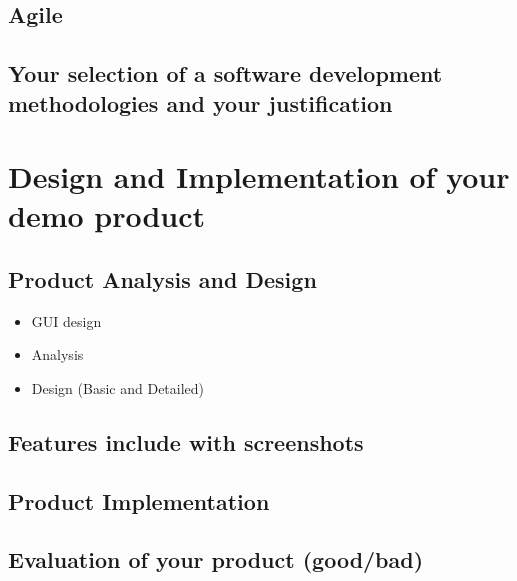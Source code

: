 \documentclass[12pt,a4paper]{article}
\begin{document}
\subsection{Agile}

\subsection{Your selection of a software development methodologies and your justification} %

\section{Design and Implementation of your demo product}

\subsection{Product Analysis and Design}
\begin{itemize}
    \item GUI design %
    \item Analysis
    \item Design (Basic and Detailed) %
\end{itemize}

\subsection{Features include with screenshots}

\subsection{Product Implementation}

\subsection{Evaluation of your product (good/bad)} %

\end{document}
